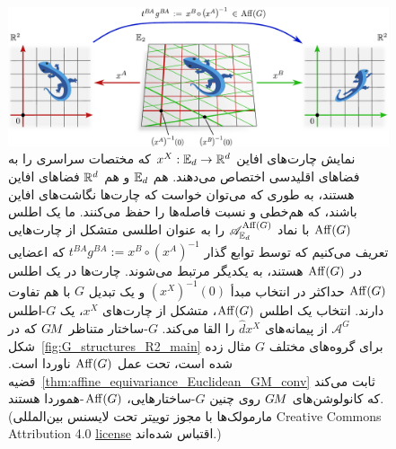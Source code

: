 \begin{figure}
	\centering
	\includegraphics[width=1.\textwidth]{figures/affine_charts.pdf}
	\vspace*{2ex}
	\caption{\small
		نمایش چارت‌های افاین $x^X: \mathbb{E}_d \to \mathbb{R}^d$ که مختصات سراسری را به فضاهای اقلیدسی اختصاص می‌دهند.
		هم $\mathbb{E}_d$ و هم $\mathbb{R}^d$ فضاهای افاین هستند، به طوری که می‌توان خواست که چارت‌ها نگاشت‌های افاین باشند، که هم‌خطی و نسبت فاصله‌ها را حفظ می‌کنند.
		ما یک اطلس $\operatorname{Aff}(G)$ با نماد $\mathscr{A}^{\operatorname{Aff}(G)}_{\mathbb{E}_d}$ را به عنوان اطلسی متشکل از چارت‌هایی تعریف می‌کنیم که توسط توابع گذار $t^{BA} g^{BA} := x^B \circ (x^A)^{-1}$ که اعضایی در $\operatorname{Aff}(G)$ هستند، به یکدیگر مرتبط می‌شوند.
		چارت‌ها در یک اطلس $\operatorname{Aff}(G)$ حداکثر در انتخاب مبدأ $(x^X)^{-1}(0)$ و یک تبدیل $G$ با هم تفاوت دارند.
		انتخاب یک اطلس $\operatorname{Aff}(G)$، متشکل از چارت‌های $x^X$، یک $G$-اطلس $\mathscr{A}^G$ از پیمانه‌های $\hat{d}x^X$ را القا می‌کند.
		$G$-ساختار متناظر $G\mkern-1.4muM$ که در شکل~\ref{fig:G_structures_R2_main} برای گروه‌های مختلف $G$ مثال زده شده است، تحت عمل $\operatorname{Aff}(G)$ ناوردا است.
		قضیه~\ref{thm:affine_equivariance_Euclidean_GM_conv} ثابت می‌کند که کانولوشن‌های $G\mkern-1.4muM$ روی چنین $G$-ساختارهایی، $\operatorname{Aff}(G)$-هموردا هستند.
		{\\
			\color{gray}
			\scriptsize
			(مارمولک‌ها با مجوز توییتر تحت لایسنس بین‌المللی 
			Creative Commons Attribution 4.0 
			\href{https://github.com/twitter/twemoji/blob/gh-pages/LICENSE-GRAPHICS}{\underline{license}}
			اقتباس شده‌اند.)
		}
	}
	\label{fig:affine_charts}
\end{figure}


